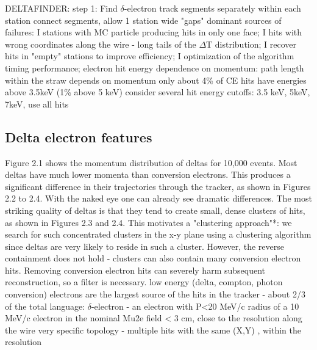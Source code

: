 DELTAFINDER:
step 1: Find $\delta$-electron track segments separately within each station
connect segments, allow 1 station wide "gaps"
dominant sources of failures:
I stations with MC particle producing hits in only one face;
I hits with wrong coordinates along the wire - long tails of the $\Delta$T distribution;
I recover hits in "empty" stations to improve efficiency;
I optimization of the algorithm timing performance;
electron hit energy dependence on momentum: path length within the straw depends on momentum
only about 4\% of CE hits have energies above 3.5keV (1\% above 5 keV)
consider several hit energy cutoffs: 3.5 keV, 5keV, 7keV, use all hits




\subsection{Delta electron features}








Figure 2.1 shows the momentum distribution of deltas for 10,000 events.
Most deltas have much lower momenta than conversion electrons. This produces a significant
difference in their trajectories through the tracker, as shown in Figures 2.2 to 2.4. With the naked eye
one can already see dramatic differences.
The most striking quality of deltas is that they tend to create small, dense clusters of hits, as
shown in Figures 2.3 and 2.4. This motivates a "clustering approach"*: we search for such
concentrated clusters in the x-y plane using a clustering algorithm since deltas are very likely to reside
in such a cluster. However, the reverse containment does not hold - clusters can also contain many
conversion electron hits. Removing conversion electron hits can severely harm subsequent
reconstruction, so a filter is necessary. 
low energy (delta, compton, photon conversion) electrons are the largest source of the hits
in the tracker - about 2/3 of the total
language: $\delta$-electron - an electron with P<20 MeV/c
radius of a 10 MeV/c electron in the nominal Mu2e field < 3 cm, close to the resolution
along the wire
very specific topology - multiple hits with the same (X,Y) , within the resolution
\fi